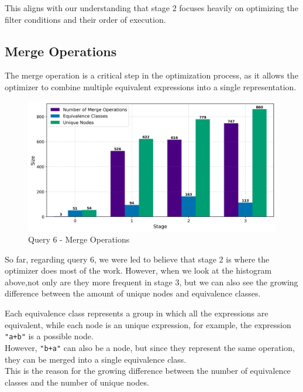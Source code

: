 \documentclass[a4paper,12pt]{scrreprt}
\begin{document}
This aligns with our understanding that stage 2 focuses heavily on optimizing the filter conditions and their order of execution.


\subsection{Merge Operations}

The merge operation is a critical step in the optimization process, as it allows the optimizer to combine multiple equivalent expressions into a single representation. 

\begin{figure}[H]
    \centering
    \includegraphics[width=\linewidth]{img_merges/q6_sizes.png}
    \caption{Query 6 - Merge Operations}
    \label{fig:merge1}
\end{figure}

So far, regarding query 6, we were led to believe that stage 2 is where the optimizer does most of the work. However, when we look at the histogram above,not only are they more frequent in stage 3, but we can also see the growing difference between the amount of unique nodes and equivalence classes. 

Each equivalence class represents a group in which all the expressions are equivalent, while each node is an unique expression, for example, the expression \texttt{"a+b"} is a possible node.\\ 
However, \texttt{"b+a"} can also be a node, but since they represent the same operation, they can be merged into a single equivalence class. \\
This is the reason for the growing difference between the number of equivalence classes and the number of unique nodes. \\


\end{document}
